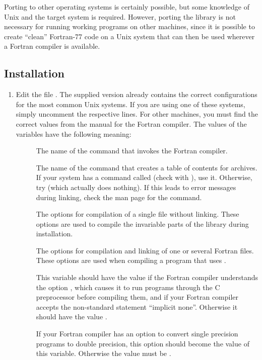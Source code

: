 Porting  to other operating systems is certainly
possible, but some knowledge of Unix and the target system is
required. However, porting the library is not necessary for running
working programs on other machines, since it is possible to create
``clean'' Fortran-77 code on a Unix system that can then be used
wherever a Fortran compiler is available.


\subsection{Installation}

\begin{enumerate}

\item
Edit the file . The supplied version already contains
the correct configurations for the most common Unix systems. If you are
using one of these systems, simply uncomment the respective lines. For
other machines, you must find the correct values from the manual for
the Fortran compiler. The values of the variables have the following
meaning:
\begin{description}
\item[] The name of the command that invokes the Fortran compiler.
\item[] The name of the command that creates a table of
contents for archives. If your system has a command called  (check
with ), use it. Otherwise, try  (which actually
does nothing). If this leads to error messages during linking, check the
man page for the  command.
\item[] The options for compilation of a single file without
linking. These options are used to compile the invariable parts of the
library during installation.
\item[] The options for compilation and linking of one
or several Fortran files. These options are used when compiling
a program that uses .
\item[] This variable should have the value  if
the Fortran compiler understands the option , which
causes it to run programs through the C preprocessor before compiling
them, and if your Fortran compiler accepts the non-standard statement
``implicit none''. Otherwise it should have the value .
\item[] If your Fortran compiler has an option to
convert single precision programs to double precision, this option
should become the value of this variable. Otherwise the value must
be .
\end{description}


\end{enumerate}

